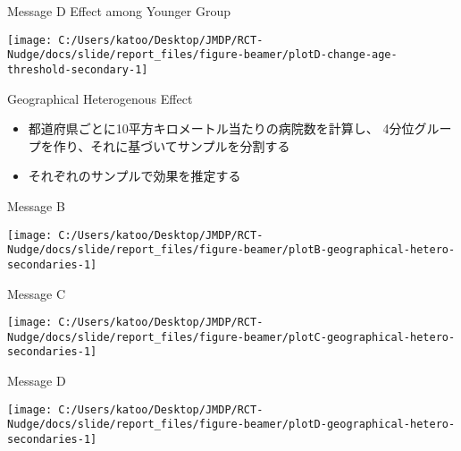 \documentclass[
      aspectratio=169,
        12pt,
    ]{beamer}
\providecommand{\tightlist}{%
  \setlength{\itemsep}{0pt}\setlength{\parskip}{0pt}}
\begin{document}
\begin{frame}{Message D Effect among Younger Group}
\protect\hypertarget{message-d-effect-among-younger-group-1}{}
\begin{center}\texttt{[image: C:/Users/katoo/Desktop/JMDP/RCT-Nudge/docs/slide/report\_files/figure-beamer/plotD-change-age-threshold-secondary-1]} \end{center}
\end{frame}

\begin{frame}{Geographical Heterogenous Effect}
\protect\hypertarget{geographical-heterogenous-effect-1}{}
\begin{itemize}
\tightlist
\item
  都道府県ごとに10平方キロメートル当たりの病院数を計算し、
  4分位グループを作り、それに基づいてサンプルを分割する
\item
  それぞれのサンプルで効果を推定する
\end{itemize}
\end{frame}

\begin{frame}{Message B}
\protect\hypertarget{message-b-2}{}
\begin{center}\texttt{[image: C:/Users/katoo/Desktop/JMDP/RCT-Nudge/docs/slide/report\_files/figure-beamer/plotB-geographical-hetero-secondaries-1]} \end{center}
\end{frame}

\begin{frame}{Message C}
\protect\hypertarget{message-c-2}{}
\begin{center}\texttt{[image: C:/Users/katoo/Desktop/JMDP/RCT-Nudge/docs/slide/report\_files/figure-beamer/plotC-geographical-hetero-secondaries-1]} \end{center}
\end{frame}

\begin{frame}{Message D}
\protect\hypertarget{message-d-2}{}
\begin{center}\texttt{[image: C:/Users/katoo/Desktop/JMDP/RCT-Nudge/docs/slide/report\_files/figure-beamer/plotD-geographical-hetero-secondaries-1]} \end{center}
\end{frame}
\end{document}
